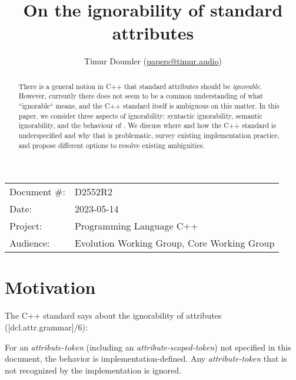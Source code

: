 

\newcommand{\forceindent}{\parindent=1em\indent\parindent=0pt\relax} %


\title{On the ignorability of standard attributes}
\author{
  Timur Doumler \small(\href{mailto:papers@timur.audio}{papers@timur.audio})
}
\date{}
\maketitle

\begin{tabular}{ll}
Document \#: & D2552R2 \\
Date: & 2023-05-14\\
Project: & Programming Language C++ \\
Audience: & Evolution Working Group, Core Working Group
\end{tabular}


\begin{abstract}
There is a general notion in C++ that standard attributes should be \emph{ignorable}. However, currently there does not seem to be a common understanding of what ``ignorable`` means, and the C++ standard itself is ambiguous on this matter. In this paper, we consider three aspects of ignorability: syntactic ignorability, semantic ignorability, and the behaviour of \mbox{}. We discuss where and how the C++ standard is underspecified and why that is problematic, survey existing implementation practice, and propose different options to resolve existing ambiguities.
\end{abstract}


\section{Motivation}
\label{sec:motivation}


The C++ standard says about the ignorability of attributes ([dcl.attr.grammar]/6):

\begin{adjustwidth}{0.5cm}{0.5cm}
For an \emph{attribute-token} (including an \emph{attribute-scoped-token})  not specified in this document, the behavior is implementation-defined. Any \emph{attribute-token} that is not recognized by the implementation is ignored.
\end{adjustwidth}

